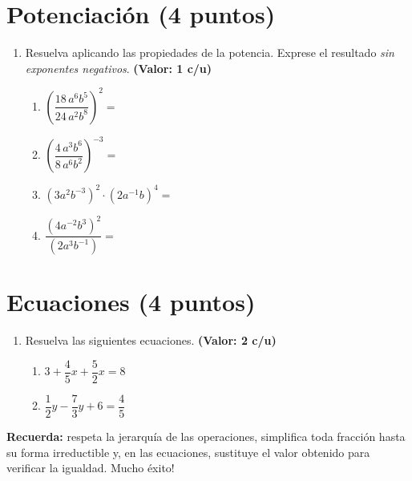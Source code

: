\documentclass[12pt, letterpaper]{article}
\begin{document}
\newpage

\section{Potenciación (4 puntos)}

\begin{enumerate}[leftmargin=*, resume]

  \item Resuelva aplicando las propiedades de la potencia. Exprese el resultado \emph{sin exponentes negativos}. \hfill \textbf{(Valor: 1 c/u)}
        \begin{enumerate}[label=\alph*), leftmargin=*]
          \item $\left(\dfrac{18\,a^6 b^5}{24\,a^2 b^8}\right)^{2} =$
          \item $\left(\dfrac{4\,a^3 b^6}{8\,a^6 b^2}\right)^{-3} =$
          \item $\left(3a^2 b^{-3}\right)^2 \cdot \left(2a^{-1} b\right)^{4} =$
          \item $\dfrac{\left(4a^{-2} b^3\right)^{2}}{\left(2a^3 b^{-1}\right)} =$
        \end{enumerate}

\end{enumerate}

\section{Ecuaciones (4 puntos)}

\begin{enumerate}[leftmargin=*, resume]

  \item Resuelva las siguientes ecuaciones. \hfill \textbf{(Valor: 2 c/u)}
        \begin{enumerate}[label=\alph*), leftmargin=*]
          \item $3 + \dfrac{4}{5}x + \dfrac{5}{2}x = 8$
          \item $\dfrac{1}{2}y - \dfrac{7}{3}y + 6 = \dfrac{4}{5}$
        \end{enumerate}

\end{enumerate}

\vspace{10pt}
\begin{cuadroinfo}
  \small
  \textbf{Recuerda:} respeta la jerarquía de las operaciones, simplifica toda fracción hasta su forma irreductible y, en las ecuaciones, sustituye el valor obtenido para verificar la igualdad. \textquestiondown Mucho éxito!
\end{cuadroinfo}
\end{document}
